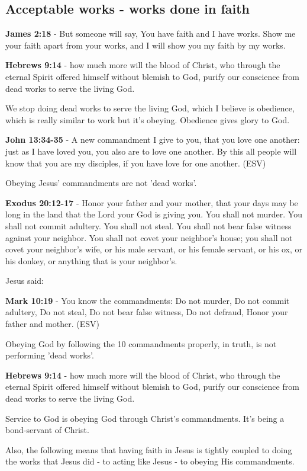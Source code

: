 \documentclass[11pt]{article}
\begin{document}
\subsection{Acceptable works - works done in faith}
\label{sec:org45796c4}
\textbf{James 2:18} - But someone will say, You have faith and I have works. Show me your faith apart from your works, and I will show you my faith by my works.

\textbf{Hebrews 9:14} - how much more will the blood of Christ, who through the eternal Spirit offered himself without blemish to God, purify our conscience from dead works to serve the living God.

We stop doing dead works to serve the living God, which I believe is obedience,
which is really similar to work but it's obeying. Obedience gives glory to God.

\textbf{John 13:34-35} - A new commandment I give to you, that you love one another: just as I have loved you, you also are to love one another. By this all people will know that you are my disciples, if you have love for one another. (ESV)

Obeying Jesus' commandments are not 'dead works'.

\textbf{Exodus 20:12-17} - Honor your father and your mother, that your days may be long in the land that the Lord your God is giving you. You shall not murder. You shall not commit adultery. You shall not steal. You shall not bear false witness against your neighbor. You shall not covet your neighbor's house; you shall not covet your neighbor's wife, or his male servant, or his female servant, or his ox, or his donkey, or anything that is your neighbor's.

Jesus said:

\textbf{Mark 10:19} - You know the commandments: Do not murder, Do not commit adultery, Do not steal, Do not bear false witness, Do not defraud, Honor your father and mother. (ESV)

Obeying God by following the 10 commandments properly, in truth, is not performing 'dead works'.

\textbf{Hebrews 9:14} - how much more will the blood of Christ, who through the eternal Spirit offered himself without blemish to God, purify our conscience from dead works to serve the living God.

Service to God is obeying God through Christ's commandments. It's being a bond-servant of Christ.

Also, the following means that having faith in Jesus is tightly coupled to doing the works that Jesus did - to acting like Jesus - to obeying His commandments.
\end{document}
